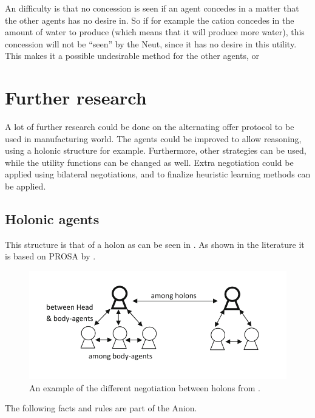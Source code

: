 An difficulty is that no concession is seen if an agent concedes in a matter that the other agents has no desire in. So if for example the cation concedes in the amount of water to produce (which means that it will produce more water), this concession will not be ``seen'' by the Neut, since it has no desire in this utility. This makes it a possible undesirable method for the other agents, or 

\section{Further research}
A lot of further research could be done on the alternating offer protocol to be used in manufacturing world. The agents could be improved to allow reasoning, using a holonic structure for example. Furthermore, other strategies can be used, while the utility functions can be changed as well. Extra negotiation could be applied using bilateral negotiations, and to finalize heuristic learning methods can be applied.

\subsection{Holonic agents}

This structure is that of a holon as can be seen in . As shown in the literature it is based on PROSA by \citep{van1998reference}.
\begin{figure}
	\centering
	\includegraphics[width=0.7\linewidth]{img/holon_example}
	\caption{An example of the different negotiation between holons from \citet{beheshti2016negotiations}.}
	\label{fig:holonexample}
\end{figure}

The following facts and rules are part of the Anion.

